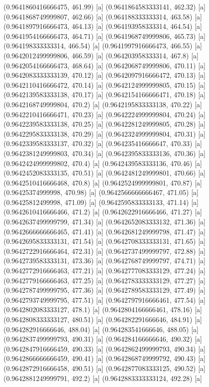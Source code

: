 {{{(0.9641860416666475, 461.99) [a] 
(0.9641864583333141, 462.32) [a] 
(0.9641868749999807, 462.66) [a] 
(0.964188333333314, 463.58) [a] 
(0.9641897916666473, 464.13) [a] 
(0.964193958333314, 464.54) [a] 
(0.9641954166666473, 464.71) [a] 
(0.9641968749999806, 465.73) [a] 
(0.964198333333314, 466.54) [a] 
(0.9641997916666473, 466.55) [a] 
(0.9642012499999806, 466.59) [a] 
(0.964203958333314, 467.8) [a] 
(0.9642054166666473, 468.64) [a] 
(0.9642068749999806, 470.11) [a] 
(0.9642083333333139, 470.12) [a] 
(0.9642097916666472, 470.13) [a] 
(0.9642110416666472, 470.14) [a] 
(0.9642124999999805, 470.15) [a] 
(0.9642139583333138, 470.17) [a] 
(0.9642154166666471, 470.18) [a] 
(0.9642168749999804, 470.2) [a] 
(0.9642195833333138, 470.22) [a] 
(0.9642210416666471, 470.23) [a] 
(0.9642224999999804, 470.24) [a] 
(0.9642239583333138, 470.25) [a] 
(0.9642281249999805, 470.28) [a] 
(0.9642295833333138, 470.29) [a] 
(0.9642324999999804, 470.31) [a] 
(0.9642339583333137, 470.32) [a] 
(0.964235416666647, 470.33) [a] 
(0.9642381249999803, 470.34) [a] 
(0.9642395833333136, 470.36) [a] 
(0.9642424999999802, 470.4) [a] 
(0.9642439583333136, 470.46) [a] 
(0.9642452083333135, 470.51) [a] 
(0.9642481249999801, 470.66) [a] 
(0.9642510416666468, 470.8) [a] 
(0.9642524999999801, 470.87) [a] 
(0.96425374999998, 470.98) [a] 
(0.9642566666666467, 471.05) [a] 
(0.96425812499998, 471.09) [a] 
(0.9642595833333133, 471.14) [a] 
(0.9642610416666466, 471.2) [a] 
(0.9642622916666466, 471.27) [a] 
(0.9642637499999799, 471.34) [a] 
(0.9642652083333132, 471.36) [a] 
(0.9642666666666465, 471.41) [a] 
(0.9642681249999798, 471.47) [a] 
(0.9642695833333131, 471.54) [a] 
(0.9642708333333131, 471.65) [a] 
(0.9642722916666464, 472.31) [a] 
(0.9642737499999797, 472.88) [a] 
(0.9642739583333131, 473.36) [a] 
(0.9642768749999797, 474.71) [a] 
(0.9642772916666463, 477.21) [a] 
(0.9642777083333129, 477.24) [a] 
(0.9642779166666463, 477.25) [a] 
(0.9642783333333129, 477.27) [a] 
(0.9642787499999795, 477.36) [a] 
(0.9642789583333129, 477.49) [a] 
(0.9642793749999795, 477.51) [a] 
(0.9642797916666461, 477.54) [a] 
(0.9642802083333127, 478.1) [a] 
(0.9642804166666461, 478.16) [a] 
(0.9642808333333127, 480.51) [a] 
(0.964282291666646, 484.91) [a] 
(0.964282916666646, 488.04) [a] 
(0.964283541666646, 488.05) [a] 
(0.9642837499999793, 490.31) [a] 
(0.964284166666646, 490.32) [a] 
(0.9642847916666459, 490.33) [a] 
(0.9642862499999793, 490.34) [a] 
(0.9642866666666459, 490.41) [a] 
(0.9642868749999792, 490.43) [a] 
(0.9642872916666458, 490.51) [a] 
(0.9642877083333125, 490.52) [a] 
(0.9642881249999791, 492.2) [a] 
(0.9642883333333124, 492.28) [a] 
}}}

